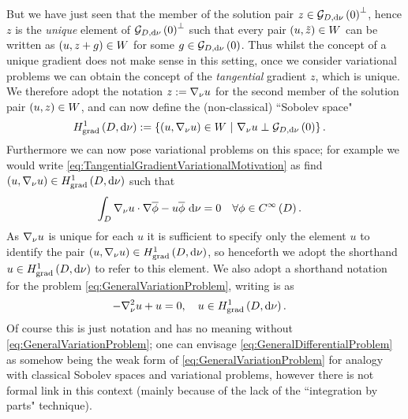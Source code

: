 But we have just seen that the member of the solution pair $z\in\mathcal{G}_{ D, \mathrm{d}\nu}\left( 0 \right)^{\perp}$, hence $z$ is the \textit{unique} element of $\mathcal{G}_{ D, \mathrm{d}\nu}\left( 0 \right)^{\perp}$ such that every pair $\left( u,\tilde{z} \right)\in W$ can be written as $\left( u,z+g \right)\in W$ for some $g\in\mathcal{G}_{ D, \mathrm{d}\nu}\left( 0 \right)$.
Thus whilst the concept of a unique gradient does not make sense in this setting, once we consider variational problems we can obtain the concept of the \textit{tangential} gradient $z$, which is unique.
We therefore adopt the notation $z := \nabla_\nu u$ for the second member of the solution pair $\left( u,z \right)\in W$, and can now define the (non-classical) ``Sobolev space"
\begin{align*}
	H^1_\mathrm{grad}\left( D, \mathrm{d}\nu \right) &:= \left\{ \left( u,\nabla_\nu u \right)\in W \ \vert \ \nabla_\nu u \perp \mathcal{G}_{ D, \mathrm{d}\nu}\left( 0 \right) \right\}.
\end{align*}
Furthermore we can now pose variational problems on this space; for example we would write \eqref{eq:TangentialGradientVariationalMotivation} as find $\left( u,\nabla_\nu u \right)\in H^1_\mathrm{grad}\left( D, \mathrm{d}\nu \right)$ such that
\begin{align} \label{eq:GeneralVariationProblem}
	\int_{D}\nabla_\nu u \cdot \nabla\overline{\phi} - u\overline{\phi} \ \mathrm{d}\nu &= 0 \quad \forall\phi\in C^{\infty}\left( D \right).
\end{align}
As $\nabla_\nu u$ is unique for each $u$ it is sufficient to specify only the element $u$ to identify the pair $\left( u,\nabla_\nu u \right)\in H^1_\mathrm{grad}\left( D, \mathrm{d}\nu \right)$, so henceforth we adopt the shorthand $u\in H^1_\mathrm{grad}\left( D, \mathrm{d}\nu \right)$ to refer to this element.
We also adopt a shorthand notation for the problem \eqref{eq:GeneralVariationProblem}, writing is as
\begin{align} \label{eq:GeneralDifferentialProblem}
	-\nabla_\nu^2 u + u &= 0, \quad u\in H^1_\mathrm{grad}\left( D, \mathrm{d}\nu \right).
\end{align}
Of course this is just notation and has no meaning without \eqref{eq:GeneralVariationProblem}; one can envisage \eqref{eq:GeneralDifferentialProblem} as somehow being the weak form of \eqref{eq:GeneralVariationProblem} for analogy with classical Sobolev spaces and variational problems, however there is not formal link in this context (mainly because of the lack of the ``integration by parts" technique). \newline

